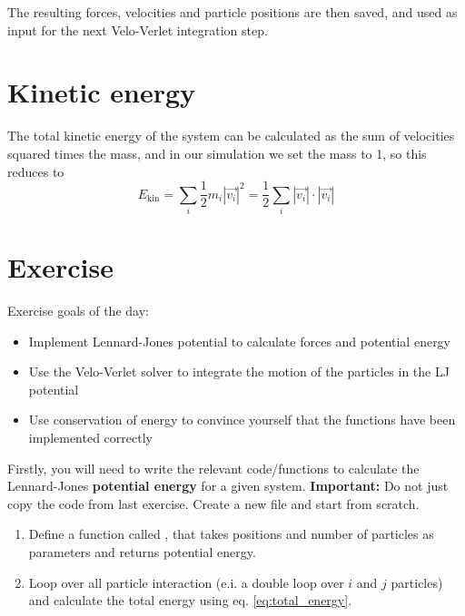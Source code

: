 \documentclass{article}
\begin{document}
The resulting forces, velocities and particle positions are then saved, and used as input for the next Velo-Verlet integration step.

\section{Kinetic energy}

The total kinetic energy of the system can be calculated as the sum of velocities squared times the mass, and in our simulation we set the mass to 1, so this reduces to
\begin{equation}
    E_{\mathrm{kin}} = \sum_i \frac{1}{2} m_i |\vec{v_i}|^2
= \frac{1}{2} \sum_i |\vec{v_i}| \cdot |\vec{v_i}|
\end{equation}

\newpage
\clearpage
\section{Exercise}

Exercise goals of the day:
\begin{itemize}
    \item Implement Lennard-Jones potential to calculate forces and potential energy
    \item Use the Velo-Verlet solver to integrate the motion of the particles in the LJ potential
    \item Use conservation of energy to convince yourself that the functions have been implemented correctly
\end{itemize}

Firstly, you will need to write the relevant code/functions to calculate the Lennard-Jones {\bf potential energy} for a given system.
{\bf Important:} Do not just copy the code from last exercise. Create a new file and start from scratch.

\begin{enumerate}

    \item Define a function called , that takes positions and number of particles as parameters and returns potential energy.

    \item Loop over all particle interaction (e.i. a double loop over $i$ and $j$ particles) and calculate the total energy using eq. \ref{eq:total_energy}.

\end{enumerate}
\end{document}
